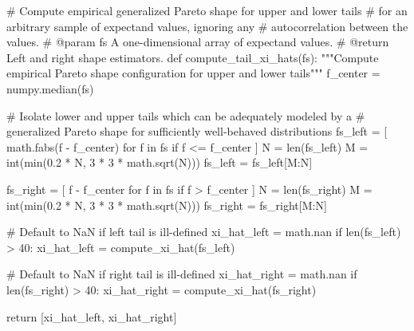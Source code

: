\documentclass[
  letterpaper,
  DIV=11,
  numbers=noendperiod]{scrartcl}
\newenvironment{Shaded}{\begin{snugshade}}{\end{snugshade}}
\newcommand{\BuiltInTok}[1]{\textcolor[rgb]{0.00,0.23,0.31}{#1}}
\newcommand{\CommentTok}[1]{\textcolor[rgb]{0.37,0.37,0.37}{#1}}
\newcommand{\ControlFlowTok}[1]{\textcolor[rgb]{0.00,0.23,0.31}{#1}}
\newcommand{\DecValTok}[1]{\textcolor[rgb]{0.68,0.00,0.00}{#1}}
\newcommand{\FloatTok}[1]{\textcolor[rgb]{0.68,0.00,0.00}{#1}}
\newcommand{\KeywordTok}[1]{\textcolor[rgb]{0.00,0.23,0.31}{#1}}
\newcommand{\NormalTok}[1]{\textcolor[rgb]{0.00,0.23,0.31}{#1}}
\newcommand{\OperatorTok}[1]{\textcolor[rgb]{0.37,0.37,0.37}{#1}}
\begin{document}
\begin{Shaded}
\begin{Highlighting}[]
\CommentTok{\# Compute empirical generalized Pareto shape for upper and lower tails}
\CommentTok{\# for an arbitrary sample of expectand values, ignoring any }
\CommentTok{\# autocorrelation between the values.}
\CommentTok{\# @param fs A one{-}dimensional array of expectand values.}
\CommentTok{\# @return Left and right shape estimators.}
\KeywordTok{def}\NormalTok{ compute\_tail\_xi\_hats(fs):}
  \CommentTok{"""Compute empirical Pareto shape configuration for upper and lower tails"""}
\NormalTok{  f\_center }\OperatorTok{=}\NormalTok{ numpy.median(fs)}
  
  \CommentTok{\# Isolate lower and upper tails which can be adequately modeled by a }
  \CommentTok{\# generalized Pareto shape for sufficiently well{-}behaved distributions}
\NormalTok{  fs\_left }\OperatorTok{=}\NormalTok{ [ math.fabs(f }\OperatorTok{{-}}\NormalTok{ f\_center) }\ControlFlowTok{for}\NormalTok{ f }\KeywordTok{in}\NormalTok{ fs }\ControlFlowTok{if}\NormalTok{ f }\OperatorTok{\textless{}=}\NormalTok{ f\_center ]}
\NormalTok{  N }\OperatorTok{=} \BuiltInTok{len}\NormalTok{(fs\_left)}
\NormalTok{  M }\OperatorTok{=} \BuiltInTok{int}\NormalTok{(}\BuiltInTok{min}\NormalTok{(}\FloatTok{0.2} \OperatorTok{*}\NormalTok{ N, }\DecValTok{3} \OperatorTok{*} \DecValTok{3} \OperatorTok{*}\NormalTok{ math.sqrt(N)))}
\NormalTok{  fs\_left }\OperatorTok{=}\NormalTok{ fs\_left[M:N]}
  
\NormalTok{  fs\_right }\OperatorTok{=}\NormalTok{ [ f }\OperatorTok{{-}}\NormalTok{ f\_center }\ControlFlowTok{for}\NormalTok{ f }\KeywordTok{in}\NormalTok{ fs }\ControlFlowTok{if}\NormalTok{ f }\OperatorTok{\textgreater{}}\NormalTok{ f\_center ]}
\NormalTok{  N }\OperatorTok{=} \BuiltInTok{len}\NormalTok{(fs\_right)}
\NormalTok{  M }\OperatorTok{=} \BuiltInTok{int}\NormalTok{(}\BuiltInTok{min}\NormalTok{(}\FloatTok{0.2} \OperatorTok{*}\NormalTok{ N, }\DecValTok{3} \OperatorTok{*} \DecValTok{3} \OperatorTok{*}\NormalTok{ math.sqrt(N)))}
\NormalTok{  fs\_right }\OperatorTok{=}\NormalTok{ fs\_right[M:N] }
  
  \CommentTok{\# Default to NaN if left tail is ill{-}defined}
\NormalTok{  xi\_hat\_left }\OperatorTok{=}\NormalTok{ math.nan}
  \ControlFlowTok{if} \BuiltInTok{len}\NormalTok{(fs\_left) }\OperatorTok{\textgreater{}} \DecValTok{40}\NormalTok{:}
\NormalTok{    xi\_hat\_left }\OperatorTok{=}\NormalTok{ compute\_xi\_hat(fs\_left)}
  
  \CommentTok{\# Default to NaN if right tail is ill{-}defined}
\NormalTok{  xi\_hat\_right }\OperatorTok{=}\NormalTok{ math.nan}
  \ControlFlowTok{if} \BuiltInTok{len}\NormalTok{(fs\_right) }\OperatorTok{\textgreater{}} \DecValTok{40}\NormalTok{:}
\NormalTok{    xi\_hat\_right }\OperatorTok{=}\NormalTok{ compute\_xi\_hat(fs\_right)}
    
  \ControlFlowTok{return}\NormalTok{ [xi\_hat\_left, xi\_hat\_right]}
\end{Highlighting}
\end{Shaded}
\end{document}
